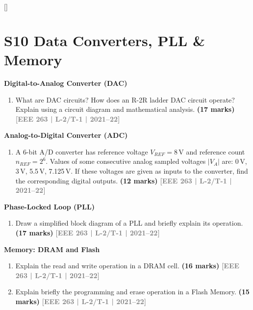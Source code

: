 \documentclass[12pt,a3paper]{article}
\newcommand{\yr}[1]{\hfill\textcolor{gray}{\small\textbf{[#1]}}}
\newcommand{\mk}[1]{\textcolor{orange!70!black}{\small\textbf{(#1 marks)}}}
\newcommand{\subtopic}[2]{%
  \vspace{10pt}
  \noindent\begin{tcolorbox}[colback=#1!8,colframe=#1,boxrule=0.6pt,arc=4pt,
    left=6pt,right=6pt,top=4pt,bottom=4pt]
    \small\bfseries\textcolor{#1}{#2}
  \end{tcolorbox}
  \vspace{2pt}
}
\begin{document}
\label{sec:S10}
\titleformat{\section}{\large\bfseries\color{cH}}{}{0em}{}[\titlerule]
\section*{S10 \quad Data Converters, PLL \& Memory}

\subtopic{cH}{Digital-to-Analog Converter (DAC)}
\label{sub:s10-dac}

\begin{enumerate}\item What are DAC circuits? How does an R-2R ladder DAC circuit operate? Explain using a circuit diagram and mathematical analysis.
\mk{17} \yr{EEE 263 | L-2/T-1 | 2021--22}

\end{enumerate}

\subtopic{cH}{Analog-to-Digital Converter (ADC)}
\label{sub:s10-adc}

\begin{enumerate}\item A 6-bit A/D converter has reference voltage $V_{REF}=8\,\text{V}$ and reference count $n_{REF}=2^6$. Values of some consecutive analog sampled voltages $|V_A|$ are: 0\,V, 3\,V, 5.5\,V, 7.125\,V. If these voltages are given as inputs to the converter, find the corresponding digital outputs.
\mk{12} \yr{EEE 263 | L-2/T-1 | 2021--22}

\end{enumerate}

\subtopic{cH}{Phase-Locked Loop (PLL)}
\label{sub:s10-pll}

\begin{enumerate}\item Draw a simplified block diagram of a PLL and briefly explain its operation.
\mk{17} \yr{EEE 263 | L-2/T-1 | 2021--22}

\end{enumerate}

\subtopic{cH}{Memory: DRAM and Flash}
\label{sub:s10-memory}

\begin{enumerate}\item Explain the read and write operation in a DRAM cell.
\mk{16} \yr{EEE 263 | L-2/T-1 | 2021--22}

\item Explain briefly the programming and erase operation in a Flash Memory.
\mk{15} \yr{EEE 263 | L-2/T-1 | 2021--22}

\end{enumerate}
\end{document}

